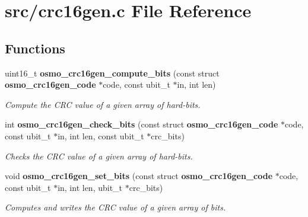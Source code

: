 \section{src/crc16gen.c File Reference}
\label{crc16gen_8c}
\subsection*{Functions}
\begin{DoxyCompactItemize}
\item 
uint16\+\_\+t \textbf{ osmo\+\_\+crc16gen\+\_\+compute\+\_\+bits} (const struct \textbf{ osmo\+\_\+crc16gen\+\_\+code} $\ast$code, const ubit\+\_\+t $\ast$in, int len)
\begin{DoxyCompactList}\small\item\em Compute the C\+RC value of a given array of hard-\/bits. \end{DoxyCompactList}\item 
int \textbf{ osmo\+\_\+crc16gen\+\_\+check\+\_\+bits} (const struct \textbf{ osmo\+\_\+crc16gen\+\_\+code} $\ast$code, const ubit\+\_\+t $\ast$in, int len, const ubit\+\_\+t $\ast$crc\+\_\+bits)
\begin{DoxyCompactList}\small\item\em Checks the C\+RC value of a given array of hard-\/bits. \end{DoxyCompactList}\item 
void \textbf{ osmo\+\_\+crc16gen\+\_\+set\+\_\+bits} (const struct \textbf{ osmo\+\_\+crc16gen\+\_\+code} $\ast$code, const ubit\+\_\+t $\ast$in, int len, ubit\+\_\+t $\ast$crc\+\_\+bits)
\begin{DoxyCompactList}\small\item\em Computes and writes the C\+RC value of a given array of bits. \end{DoxyCompactList}\end{DoxyCompactItemize}
